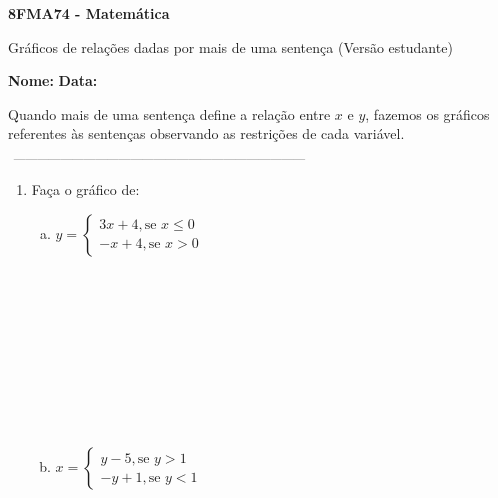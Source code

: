 \documentclass[a4paper,14pt]{article}
\begin{document}
	
	\noindent\textbf{8FMA74 - Matemática} 
	
	\begin{center}Gráficos de relações dadas por mais de uma sentença (Versão estudante)
	\end{center}
	
	\noindent\textbf{Nome:} \underline{\hspace{10cm}}
	\noindent\textbf{Data:} \underline{\hspace{4cm}}
	
	
	
    \begin{multicols}{2}
    	\noindent Quando mais de uma sentença define a relação entre $x$ e $y$, fazemos os gráficos referentes às sentenças observando as restrições de cada variável.
    	\noindent\textsubscript{~---------------------------------------------------------------------------}
		\begin{enumerate}
			\item Faça o gráfico de:
			\begin{enumerate}[a)]
				\item $y =
				\begin{cases}
					3x+4, \text{se~} x \leq 0 \\
					-x + 4, \text{se~} x > 0
				\end{cases}$\\\\\\\\\\\\\\\\\\\\
			    \item $x = 
			    \begin{cases}
			    	y - 5, \text{se~} y > 1 \\
			    	-y + 1, \text{se~} y < 1
			    \end{cases}$\\\\\\\\\\\\\\\\\\\\

\end{enumerate}
\end{enumerate}
\end{multicols}
\end{document}
